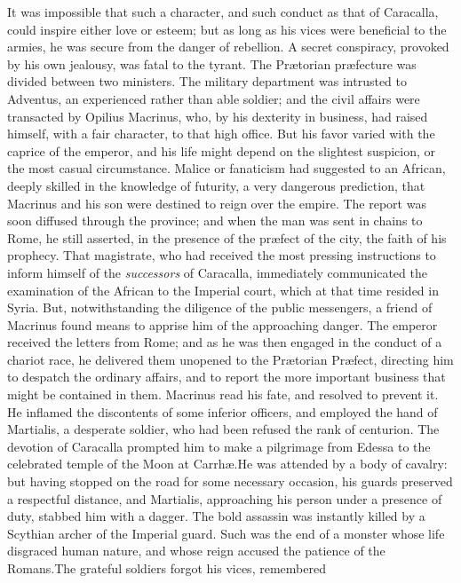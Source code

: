 It was impossible that such a character, and such conduct as that
of Caracalla, could inspire either love or esteem; but as long as
his vices were beneficial to the armies, he was secure from the
danger of rebellion. A secret conspiracy, provoked by his own
jealousy, was fatal to the tyrant. The Prætorian præfecture was
divided between two ministers. The military department was
intrusted to Adventus, an experienced rather than able soldier;
and the civil affairs were transacted by Opilius Macrinus, who,
by his dexterity in business, had raised himself, with a fair
character, to that high office. But his favor varied with the
caprice of the emperor, and his life might depend on the
slightest suspicion, or the most casual circumstance. Malice or
fanaticism had suggested to an African, deeply skilled in the
knowledge of futurity, a very dangerous prediction, that Macrinus
and his son were destined to reign over the empire. The report
was soon diffused through the province; and when the man was sent
in chains to Rome, he still asserted, in the presence of the
præfect of the city, the faith of his prophecy. That magistrate,
who had received the most pressing instructions to inform himself
of the \textit{successors} of Caracalla, immediately communicated the
examination of the African to the Imperial court, which at that
time resided in Syria. But, notwithstanding the diligence of the
public messengers, a friend of Macrinus found means to apprise
him of the approaching danger. The emperor received the letters
from Rome; and as he was then engaged in the conduct of a chariot
race, he delivered them unopened to the Prætorian Præfect,
directing him to despatch the ordinary affairs, and to report the
more important business that might be contained in them. Macrinus
read his fate, and resolved to prevent it. He inflamed the
discontents of some inferior officers, and employed the hand of
Martialis, a desperate soldier, who had been refused the rank of
centurion. The devotion of Caracalla prompted him to make a
pilgrimage from Edessa to the celebrated temple of the Moon at
Carrhæ.\footnotemark[381] He was attended by a body of cavalry: but having
stopped on the road for some necessary occasion, his guards
preserved a respectful distance, and Martialis, approaching his
person under a presence of duty, stabbed him with a dagger. The
bold assassin was instantly killed by a Scythian archer of the
Imperial guard. Such was the end of a monster whose life
disgraced human nature, and whose reign accused the patience of
the Romans.\footnotemark[39] The grateful soldiers forgot his vices, remembered

